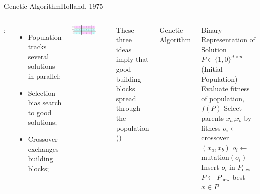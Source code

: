 \documentclass[aspectratio=169]{beamer}
\begin{document}
\begin{frame}{Genetic Algorithm}{Holland, 1975}
  \begin{columns}
    :
    \begin{itemize}
      \item Population tracks several solutions in parallel;
      \item Selection bias search to good solutions;
      \item Crossover exchanges building blocks;
    \end{itemize}

    \begin{center}
      \includegraphics[width=0.7\textwidth]{img/GA_crossover.png}
    \end{center}

    These three ideas imply that good building blocks spread through the population ()

      Genetic Algorithm\bigskip

      \begin{algorithmic}[1]
        \Require Binary Representation of Solution
        \Require $P \in \{1, 0\}^{d\times p}$ (Initial Population)
          \State Evaluate fitness of population, $f(P)$
          \State Select parents $x_a$,$x_b$ by fitness
          \State $o_i \gets$ crossover$(x_a, x_b)$
          \State $o_i \gets$ mutation$(o_i)$
          \State Insert $o_i$ in $P_{\text{new}}$
          \EndFor
          \State $P \gets P_{\text{new}}$
        \EndWhile
         best $x \in P$
      \end{algorithmic}
  \end{columns}
\end{frame}
\end{document}
